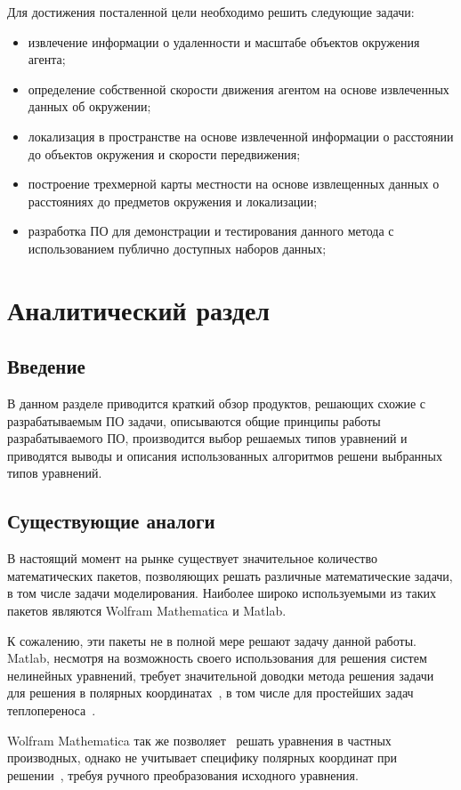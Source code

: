 Для достижения посталенной цели необходимо решить следующие задачи:
\begin{itemize}
    \item извлечение информации о удаленности и масштабе объектов окружения агента;
    \item определение собственной скорости движения агентом на основе извлеченных данных об окружении;
    \item локализация в пространстве на основе извлеченной информации о расстоянии до объектов окружения и скорости передвижения;
    \item построение трехмерной карты местности на основе извлещенных данных о расстояниях до предметов окружения и локализации;
    \item разработка ПО для демонстрации и тестирования данного метода с использованием публично доступных наборов данных;
\end{itemize}

\section{Аналитический раздел}
\subsection{Введение}
В данном разделе приводится краткий обзор продуктов, решающих схожие с 
разрабатываемым ПО задачи, описываются общие принципы работы разрабатываемого 
ПО, производится выбор решаемых типов уравнений и приводятся выводы и описания 
использованных алгоритмов решени выбранных типов уравнений.

\subsection{Существующие аналоги}
В настоящий момент на рынке существует значительное количество математических 
пакетов, позволяющих решать различные математические задачи, в том числе задачи 
моделирования. Наиболее широко используемыми из таких пакетов являются Wolfram 
Mathematica и Matlab.

К сожалению, эти пакеты не в полной мере решают задачу данной работы.
Matlab, несмотря на возможность своего использования для решения систем 
нелинейных уравнений, требует значительной доводки метода решения задачи для 
решения в полярных координатах~\cite{matlab-polar}, в том числе для простейших 
задач теплопереноса~\cite{matlab-discussion}.

Wolfram Mathematica так же позволяет~\cite{wolfram-solves} 
решать уравнения в частных производных, однако не учитывает специфику полярных 
координат при решении~\cite{wolfram-polar}, требуя ручного преобразования 
исходного уравнения.

